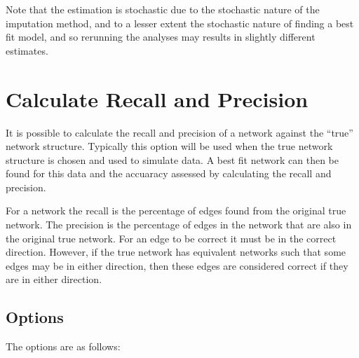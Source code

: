 \documentclass[a4paper,12pt]{article}
\begin{document}
Note that the estimation is stochastic due to the stochastic nature of the imputation method, and to a lesser extent the stochastic nature of finding a best fit model, and so rerunning the analyses may results in slightly different estimates. 




\section{Calculate Recall and Precision}
\label{calc-recall-precision}

It is possible to calculate the recall and precision of a network against the ``true'' network structure. Typically this option will be used when the true network structure is chosen and used to simulate data. A best fit network can then be found for this data and the accuaracy assessed by calculating the recall and precision. 

For a network the recall is the percentage of edges found from the original true network. The precision is the percentage of edges in the network that are also in the original true network. For an edge to be correct it must be in the correct direction. However, if the true network has equivalent networks such that some edges may be in either direction, then these edges are considered correct if they are in either direction. 
\subsection{Options}
\label{calc-recall-precision-options}

The options are as follows: 

{\begin{center}\end{center}}
\end{document}
